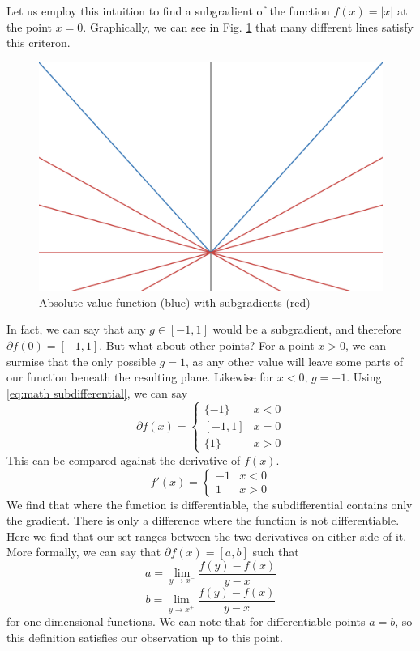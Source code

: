 \documentclass[journal,onecolumn]{IEEEtran}
\begin{document}
Let us employ this intuition to find a subgradient of the function \(f(x) = |x|\) at the point \(x=0\). Graphically, we can see in Fig. \ref{fig:abs subgradients} that many different lines satisfy this criteron.
\begin{figure}[tbp]
    \centering
    \includegraphics[width=0.5\linewidth]{Figures/abs_subgradients.png}
    \caption{Absolute value function (blue) with subgradients (red)}
    \label{fig:abs subgradients}
\end{figure}
In fact, we can say that any \(g \in [-1,1]\) would be a subgradient, and therefore \(\partial f(0) = [-1,1]\). But what about other points? For a point \(x > 0\), we can surmise that the only possible \(g = 1\), as any other value will leave some parts of our function beneath the resulting plane. Likewise for \(x < 0\), \(g = -1\). Using \eqref{eq:math subdifferential}, we can say
\begin{equation}\label{eq:abs subdifferential}
\partial f(x) = \begin{cases}
    \{-1\} & x < 0 \\
    [-1, 1] & x = 0\\
    \{1\} & x > 0
\end{cases}
\end{equation}
This can be compared against the derivative of \(f(x)\).
\begin{equation}\label{eq:abs derivative}
f'(x) = \begin{cases}
            -1 & x < 0\\
            1 & x > 0
\end{cases}
\end{equation}
We find that where the function is differentiable, the subdifferential contains only the gradient. There is only a difference where the function is not differentiable. Here we find that our set ranges between the two derivatives on either side of it. More formally, we can say that \(\partial f(x) = [a, b]\) such that
\begin{equation}\label{eq:subdifferential a def}
a = \lim_{y \rightarrow x^-} \frac{f(y)-f(x)}{y-x}
\end{equation}
\begin{equation}\label{eq:subdifferential b def}
b = \lim_{y \rightarrow x^+} \frac{f(y)-f(x)}{y-x}
\end{equation}
for one dimensional functions. We can note that for differentiable points \(a = b\), so this definition satisfies our observation up to this point.
\end{document}
